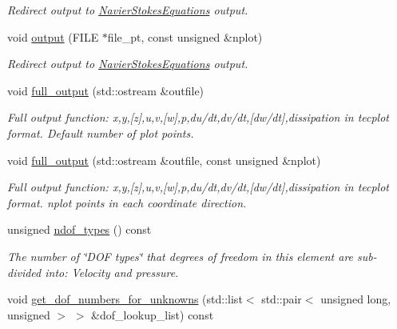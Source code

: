 \begin{DoxyCompactItemize}
\begin{DoxyCompactList}\small\item\em Redirect output to \hyperlink{classoomph_1_1NavierStokesEquations}{Navier\+Stokes\+Equations} output. \end{DoxyCompactList}\item 
void \hyperlink{classoomph_1_1QCrouzeixRaviartElement_a81470fac7a7ea2b58653db52af63ad00}{output} (F\+I\+LE $\ast$file\+\_\+pt, const unsigned \&nplot)
\begin{DoxyCompactList}\small\item\em Redirect output to \hyperlink{classoomph_1_1NavierStokesEquations}{Navier\+Stokes\+Equations} output. \end{DoxyCompactList}\item 
void \hyperlink{classoomph_1_1QCrouzeixRaviartElement_a9ee28cdd78a66ab09733322caeeff502}{full\+\_\+output} (std\+::ostream \&outfile)
\begin{DoxyCompactList}\small\item\em Full output function\+: x,y,\mbox{[}z\mbox{]},u,v,\mbox{[}w\mbox{]},p,du/dt,dv/dt,\mbox{[}dw/dt\mbox{]},dissipation in tecplot format. Default number of plot points. \end{DoxyCompactList}\item 
void \hyperlink{classoomph_1_1QCrouzeixRaviartElement_aa38eca6cb5bfec6206d92ccfaa27177b}{full\+\_\+output} (std\+::ostream \&outfile, const unsigned \&nplot)
\begin{DoxyCompactList}\small\item\em Full output function\+: x,y,\mbox{[}z\mbox{]},u,v,\mbox{[}w\mbox{]},p,du/dt,dv/dt,\mbox{[}dw/dt\mbox{]},dissipation in tecplot format. nplot points in each coordinate direction. \end{DoxyCompactList}\item 
unsigned \hyperlink{classoomph_1_1QCrouzeixRaviartElement_ad252ba37ecfb028ccd851ab6600d4df3}{ndof\+\_\+types} () const
\begin{DoxyCompactList}\small\item\em The number of \char`\"{}\+D\+O\+F types\char`\"{} that degrees of freedom in this element are sub-\/divided into\+: Velocity and pressure. \end{DoxyCompactList}\item 
void \hyperlink{classoomph_1_1QCrouzeixRaviartElement_a2c4a2475b10e711163c3e63835acf9a8}{get\+\_\+dof\+\_\+numbers\+\_\+for\+\_\+unknowns} (std\+::list$<$ std\+::pair$<$ unsigned long, unsigned $>$ $>$ \&dof\+\_\+lookup\+\_\+list) const

\end{DoxyCompactItemize}
